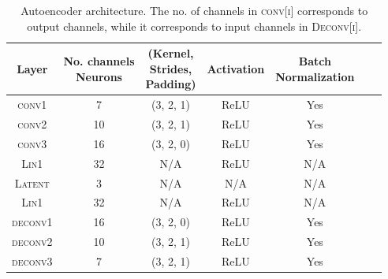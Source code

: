 \documentclass[11pt]{article} %
\begin{document}
\begin{table}
\centering
    \begin{tabular}{ccccccc}
        Layer & \thead{No. channels \\ Neurons} & \thead{(Kernel,\\ Strides,\\ Padding)} & Activation & \thead{Batch \\ Normalization}\\
        \hline
        \textsc{conv1} & 7 & (3, 2, 1) & ReLU & Yes\\
        \textsc{conv2} & 10 & (3, 2, 1) & ReLU & Yes\\
        \textsc{conv3} & 16 & (3, 2, 0) & ReLU & Yes\\
        \textsc{Lin1} & 32 & N/A & ReLU & N/A \\
        \hdashline
        \textsc{Latent} & 3 & N/A & N/A & N/A \\
        \hdashline
        \textsc{Lin1} & 32 & N/A & ReLU & N/A \\
        \textsc{deconv1} & 16 & (3, 2, 0) & ReLU & Yes\\
        \textsc{deconv2} & 10 & (3, 2, 1) & ReLU & Yes\\
        \textsc{deconv3} & 7 & (3, 2, 1) & ReLU & Yes\\
    \end{tabular}
    \caption{Autoencoder architecture. The no. of channels in \textsc{conv[i]} corresponds to output channels, while it corresponds to input channels in \textsc{Deconv[i]}.}
    \label{tab:AE_params}
\end{table}
\end{document}
